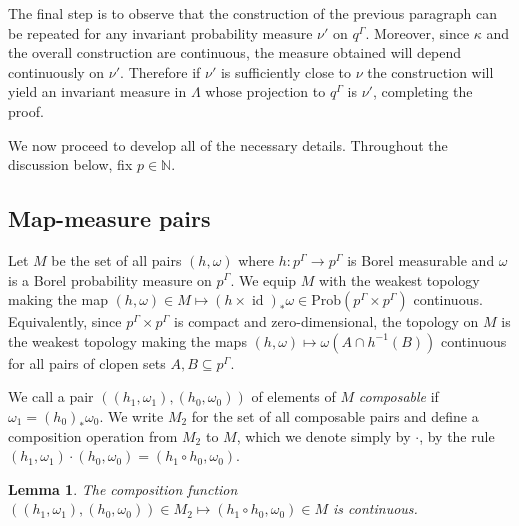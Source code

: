 \documentclass[12pt]{amsart}
\newtheorem{lem}[thm]{Lemma}
\theoremstyle{definition}
\def\bb{\mathbb}
\def\bb{\mathbb}
\DeclareMathOperator{\id}{id}
\newcommand{\Prob}{\mathrm{Prob}}
\begin{document}
The final step is to observe that the construction of the previous paragraph can be repeated for any invariant probability measure $\nu'$ on $q^\Gamma$. Moreover, since $\kappa$ and the overall construction are continuous, the measure obtained will depend continuously on $\nu'$. Therefore if $\nu'$ is sufficiently close to $\nu$ the construction will yield an invariant measure in $\Lambda$ whose projection to $q^\Gamma$ is $\nu'$, completing the proof.

We now proceed to develop all of the necessary details. Throughout the discussion below, fix $p \in \bb N$. 

\subsection{Map-measure pairs}

Let $M$ be the set of all pairs $(h, \omega)$ where $h : p^\Gamma \rightarrow p^\Gamma$ is Borel measurable and $\omega$ is a Borel probability measure on $p^\Gamma$. We equip $M$ with the weakest topology making the map $(h, \omega) \in M \mapsto (h \times \id)_* \omega \in \Prob(p^\Gamma \times p^\Gamma)$ continuous. Equivalently, since $p^\Gamma \times p^\Gamma$ is compact and zero-dimensional, the topology on $M$ is the weakest topology making the maps $(h, \omega) \mapsto \omega(A \cap h^{-1}(B))$ continuous for all pairs of clopen sets $A, B \subseteq p^\Gamma$.

We call a pair $((h_1, \omega_1), (h_0, \omega_0))$ of elements of $M$ \emph{composable} if $\omega_1 = (h_0)_* \omega_0$. We write $M_2$ for the set of all composable pairs and define a composition operation from $M_2$ to $M$, which we denote simply by $\cdot$, by the rule $(h_1, \omega_1) \cdot (h_0, \omega_0) = (h_1 \circ h_0, \omega_0)$.

\begin{lem} \label{lem:comp}
	The composition function $((h_1, \omega_1),(h_0,\omega_0)) \in M_2 \mapsto (h_1 \circ h_0, \omega_0) \in M$ is continuous.
\end{lem}
\end{document}
